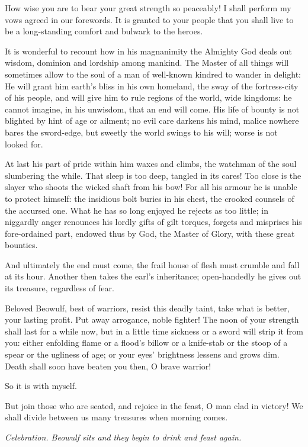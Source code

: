 \documentclass[a4paper]{article}
\begin{document}
{How wise you are to bear
your great strength so peaceably! I shall perform my vows
agreed in our forewords. It is granted to your people
that you shall live to be a long-standing comfort
and bulwark to the heroes.

It is wonderful to recount
how in his magnanimity the Almighty God
deals out wisdom, dominion and lordship
among mankind. The Master of all things
will sometimes allow to the soul of a man
of well-known kindred to wander in delight:
He will grant him earth’s bliss in his own homeland,
the sway of the fortress-city of his people,
and will give him to rule regions of the world,
wide kingdoms: he cannot imagine,
in his unwisdom, that an end will come.
His life of bounty is not blighted by hint
of age or ailment; no evil care
darkens his mind, malice nowhere
bares the sword-edge, but sweetly the world
swings to his will; worse is not looked for.

At last his part of pride within him
waxes and climbs, the watchman of the soul
slumbering the while. That sleep is too deep,
tangled in its cares! Too close is the slayer
who shoots the wicked shaft from his bow!
For all his armour he is unable to protect himself:
the insidious bolt buries in his chest,
the crooked counsels of the accursed one.
What he has so long enjoyed he rejects as too little;
in niggardly anger renounces his lordly
gifts of gilt torques, forgets and misprises
his fore-ordained part, endowed thus by God,
the Master of Glory, with these great bounties.

And ultimately the end must come,
the frail house of flesh must crumble
and fall at its hour. Another then takes
the earl’s inheritance; open-handedly
he gives out its treasure, regardless of fear.

Beloved Beowulf, best of warriors,
resist this deadly taint, take what is better,
your lasting profit. Put away arrogance,
noble fighter! The noon of your strength
shall last for a while now, but in a little time
sickness or a sword will strip it from you:
either enfolding flame or a flood’s billow
or a knife-stab or the stoop of a spear
or the ugliness of age; or your eyes’ brightness
lessens and grows dim. Death shall soon
have beaten you then, O brave warrior!

So it is with myself.

But join those who are seated, and rejoice in the feast,
O man clad in victory! We shall divide between us
many treasures when morning comes.

\centerline{\textit{Celebration. Beowulf sits and they begin to drink and feast again.}}

}
\end{document}
